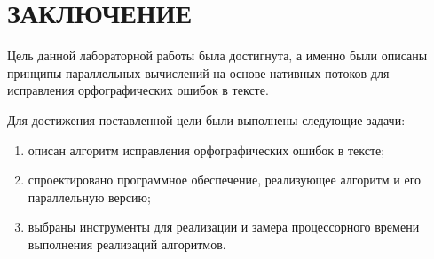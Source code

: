 \chapter*{ЗАКЛЮЧЕНИЕ}

Цель данной лабораторной работы была достигнута, а именно были описаны принципы параллельных вычислений на основе нативных потоков для исправления орфографических ошибок в тексте.

Для достижения поставленной цели были выполнены следующие задачи:
\begin{enumerate}
	\item описан алгоритм исправления орфографических ошибок в тексте;
	\item спроектировано программное обеспечение, реализующее алгоритм и его параллельную версию;
	\item выбраны инструменты для реализации и замера процессорного времени
	выполнения реализаций алгоритмов.
\end{enumerate}
